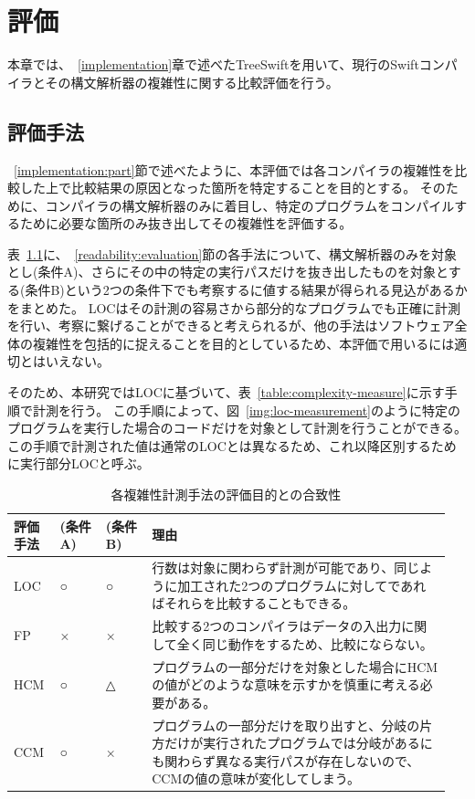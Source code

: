 \chapter{評価}
\label{evaluation}

本章では、~\ref{implementation}章で述べたTreeSwiftを用いて、現行のSwiftコンパイラとその構文解析器の複雑性に関する比較評価を行う。

\section{評価手法}
\label{evaluation:method}

~\ref{implementation:part}節で述べたように、本評価では各コンパイラの複雑性を比較した上で比較結果の原因となった箇所を特定することを目的とする。
そのために、コンパイラの構文解析器のみに着目し、特定のプログラムをコンパイルするために必要な箇所のみ抜き出してその複雑性を評価する。

表~\ref{table:evaluation-property}に、~\ref{readability:evaluation}節の各手法について、構文解析器のみを対象とし(条件A)、さらにその中の特定の実行パスだけを抜き出したものを対象とする(条件B)という2つの条件下でも考察するに値する結果が得られる見込があるかをまとめた。
LOCはその計測の容易さから部分的なプログラムでも正確に計測を行い、考察に繋げることができると考えられるが、他の手法はソフトウェア全体の複雑性を包括的に捉えることを目的としているため、本評価で用いるには適切とはいえない。

そのため、本研究ではLOCに基づいて、表~\ref{table:complexity-measure}に示す手順で計測を行う。
この手順によって、図~\ref{img:loc-measurement}のように特定のプログラムを実行した場合のコードだけを対象として計測を行うことができる。
この手順で計測された値は通常のLOCとは異なるため、これ以降区別するために実行部分LOCと呼ぶ。

\begin{table}[!hbtp]
    \begin{center}
        \caption{各複雑性計測手法の評価目的との合致性}
        \begin{tabular}{|p{0.1\linewidth}|p{0.1\linewidth}|p{0.1\linewidth}|p{0.65\linewidth}|}
            \hline
            評価手法 & (条件A) & (条件B) & 理由\\
            \hline
            \hline
            LOC & ○ & ○ & 行数は対象に関わらず計測が可能であり、同じように加工された2つのプログラムに対してであればそれらを比較することもできる。\\
            \hline
            FP & × & × & 比較する2つのコンパイラはデータの入出力に関して全く同じ動作をするため、比較にならない。\\
            \hline
            HCM & ○ & △ & プログラムの一部分だけを対象とした場合にHCMの値がどのような意味を示すかを慎重に考える必要がある。\\
            \hline
            CCM & ○ & × & プログラムの一部分だけを取り出すと、分岐の片方だけが実行されたプログラムでは分岐があるにも関わらず異なる実行パスが存在しないので、CCMの値の意味が変化してしまう。\\
            \hline
        \end{tabular}
        \label{table:evaluation-property}
    \end{center}
\end{table}

